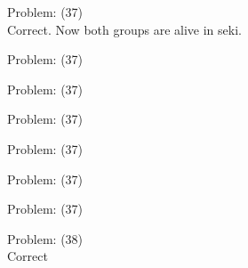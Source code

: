\documentclass[11pt]{article}
\begin{document}
\begin{minipage}[t]{0.5\textwidth}
  {\centering
  
  Problem: (37)\\
  Correct. Now both groups are alive in seki.\\
  }
\end{minipage}
\begin{minipage}[t]{0.5\textwidth}
  {\centering
  
  Problem: (37)\\
  
  }
\end{minipage}
\begin{minipage}[t]{0.5\textwidth}
  {\centering
  
  Problem: (37)\\
  
  }
\end{minipage}
\begin{minipage}[t]{0.5\textwidth}
  {\centering
  
  Problem: (37)\\
  
  }
\end{minipage}
\begin{minipage}[t]{0.5\textwidth}
  {\centering
  
  Problem: (37)\\
  
  }
\end{minipage}
\begin{minipage}[t]{0.5\textwidth}
  {\centering
  
  Problem: (37)\\
  
  }
\end{minipage}
\begin{minipage}[t]{0.5\textwidth}
  {\centering
  
  Problem: (37)\\
  
  }
\end{minipage}
\begin{minipage}[t]{0.5\textwidth}
  {\centering
  
  Problem: (38)\\
  Correct\\
  }
\end{minipage}
\end{document}
